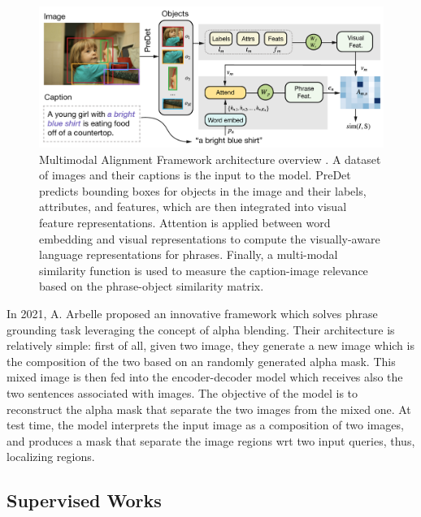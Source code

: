 \begin{figure}
  \centering
  \includegraphics[width=.8\textwidth]{figures/maf-model.png}
  \caption[Multimodal Alignment Framework architecture
  overview]{Multimodal Alignment Framework architecture overview
  \cite{wang2020maf}. A dataset of images and their captions is the
  input to the model. PreDet predicts bounding boxes for objects in
  the image and their labels, attributes, and features, which are then
  integrated into visual feature representations. Attention is applied
  between word embedding and visual representations to compute the
  visually-aware language representations for phrases. Finally, a
  multi-modal similarity function is used to measure the caption-image
  relevance based on the phrase-object similarity matrix.}
  \label{fig:maf-model}
\end{figure}

In 2021, A. Arbelle \etal{} \cite{arbelle2021detector} proposed an
innovative framework which solves phrase grounding task leveraging the
concept of alpha blending. Their architecture is relatively simple:
first of all, given two image, they generate a new image which is the
composition of the two based on an randomly generated alpha mask. This
mixed image is then fed into the encoder-decoder model which receives
also the two sentences associated with images. The objective of the
model is to reconstruct the alpha mask that separate the two images
from the mixed one. At test time, the model interprets the input image
as a composition of two images, and produces a mask that separate the
image regions wrt two input queries, thus, localizing regions.

\subsection{Supervised Works}
\label{subsec:related-full-grounding}


